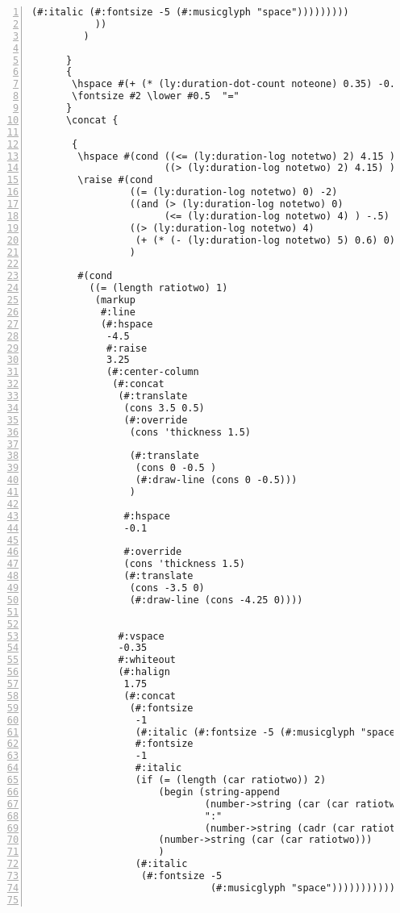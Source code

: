 \begin{Verbatim}[numbers=left,xleftmargin=5mm]
                 (#:italic (#:fontsize -5 (#:musicglyph "space")))))))))
           ))
         )

      }
      {
       \hspace #(+ (* (ly:duration-dot-count noteone) 0.35) -0.2)
       \fontsize #2 \lower #0.5  "="
      }
      \concat {

       {
        \hspace #(cond ((<= (ly:duration-log notetwo) 2) 4.15 )
                       ((> (ly:duration-log notetwo) 2) 4.15) )
        \raise #(cond
                 ((= (ly:duration-log notetwo) 0) -2)
                 ((and (> (ly:duration-log notetwo) 0)
                       (<= (ly:duration-log notetwo) 4) ) -.5)
                 ((> (ly:duration-log notetwo) 4)
                  (+ (* (- (ly:duration-log notetwo) 5) 0.6) 0))
                 )

        #(cond
          ((= (length ratiotwo) 1)
           (markup
            #:line
            (#:hspace
             -4.5
             #:raise
             3.25
             (#:center-column
              (#:concat
               (#:translate
                (cons 3.5 0.5)
                (#:override
                 (cons 'thickness 1.5)

                 (#:translate
                  (cons 0 -0.5 )
                  (#:draw-line (cons 0 -0.5)))
                 )

                #:hspace
                -0.1

                #:override
                (cons 'thickness 1.5)
                (#:translate
                 (cons -3.5 0)
                 (#:draw-line (cons -4.25 0))))


               #:vspace
               -0.35
               #:whiteout
               (#:halign
                1.75
                (#:concat
                 (#:fontsize
                  -1
                  (#:italic (#:fontsize -5 (#:musicglyph "space")))
                  #:fontsize
                  -1
                  #:italic
                  (if (= (length (car ratiotwo)) 2)
                      (begin (string-append
                              (number->string (car (car ratiotwo)))
                              ":"
                              (number->string (cadr (car ratiotwo)))))
                      (number->string (car (car ratiotwo)))
                      )
                  (#:italic
                   (#:fontsize -5
                               (#:musicglyph "space")))))))))))


\end{Verbatim}
